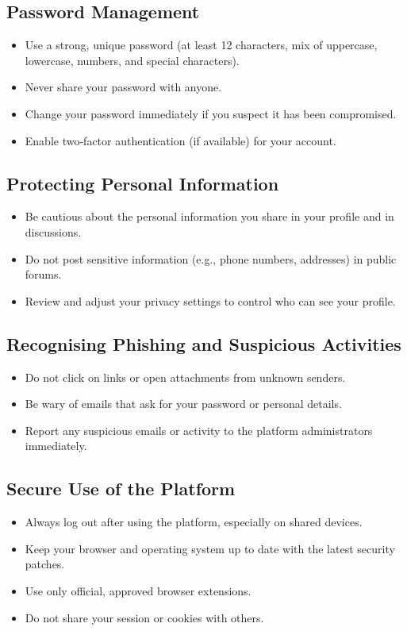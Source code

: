 \subsection{Password Management}
\begin{itemize}
    \item Use a strong, unique password (at least 12 characters, mix of uppercase, lowercase, numbers, and special characters).
    \item Never share your password with anyone.
    \item Change your password immediately if you suspect it has been compromised.
    \item Enable two‑factor authentication (if available) for your account.
\end{itemize}

\subsection{Protecting Personal Information}
\begin{itemize}
    \item Be cautious about the personal information you share in your profile and in discussions.
    \item Do not post sensitive information (e.g., phone numbers, addresses) in public forums.
    \item Review and adjust your privacy settings to control who can see your profile.
\end{itemize}

\subsection{Recognising Phishing and Suspicious Activities}
\begin{itemize}
    \item Do not click on links or open attachments from unknown senders.
    \item Be wary of emails that ask for your password or personal details.
    \item Report any suspicious emails or activity to the platform administrators immediately.
\end{itemize}

\subsection{Secure Use of the Platform}
\begin{itemize}
    \item Always log out after using the platform, especially on shared devices.
    \item Keep your browser and operating system up to date with the latest security patches.
    \item Use only official, approved browser extensions.
    \item Do not share your session or cookies with others.
\end{itemize}

